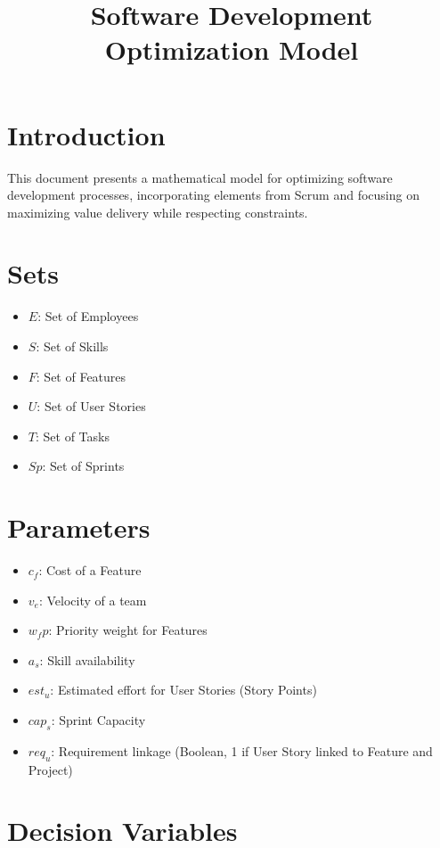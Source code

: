 \documentclass{article}
\begin{document}
\title{Software Development Optimization Model}
\date{}
\maketitle

\section{Introduction}

This document presents a mathematical model for optimizing software development processes, incorporating elements from Scrum and focusing on maximizing value delivery while respecting constraints.

\section{Sets}

\begin{itemize}
    \item $E$: Set of Employees
    \item $S$: Set of Skills
    \item $F$: Set of Features
    \item $U$: Set of User Stories
    \item $T$: Set of Tasks
    \item $Sp$: Set of Sprints
\end{itemize}

\section{Parameters}

\begin{itemize}
    \item $c_f$: Cost of a Feature
    \item $v_e$: Velocity of a team
    \item $w_fp$: Priority weight for Features
    \item $a_s$: Skill availability
    \item $est_u$: Estimated effort for User Stories (Story Points)
    \item $cap_s$: Sprint Capacity
    \item $req_u$: Requirement linkage (Boolean, 1 if User Story linked to Feature and Project)
\end{itemize}

\section{Decision Variables}
\end{document}
